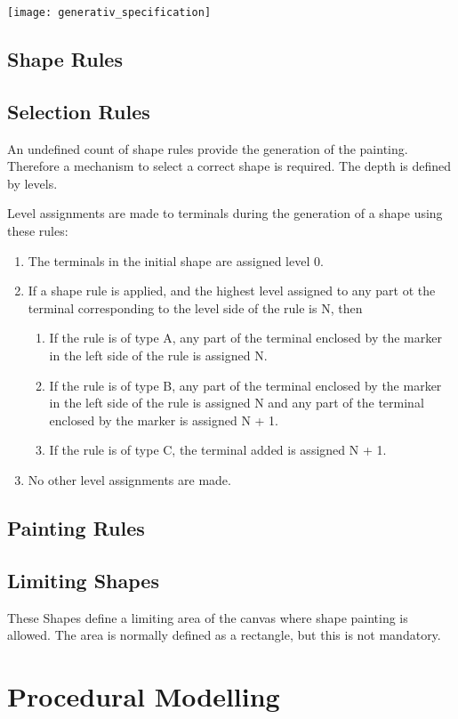 \documentclass[11pt, a4paper]{report}
\begin{document}
\texttt{[image: generativ\_specification]}
\subsection{Shape Rules}


\subsection{Selection Rules}
An undefined count of shape rules provide the generation of the painting. Therefore a mechanism to select a correct shape is required. The depth is defined by levels.
\begin{displayquote}
	Level assignments are made to terminals during the generation of a shape using these rules:
	\begin{enumerate}
		\item The terminals in the initial shape are assigned level 0.
		\item If a shape rule is applied, and the highest level assigned to any part ot the terminal corresponding to the level side of the rule is N, then
		\begin{enumerate}
			\item If the rule is of type A, any part of the terminal enclosed by the marker in the left side of the rule is assigned N.
			\item If the rule is of type B, any part of the terminal enclosed by the marker in the left side of the rule is assigned N and any part of the terminal enclosed by the marker is assigned N + 1.
			\item If the rule is of type C, the terminal added is assigned N + 1.
		\end{enumerate}
		\item No other level assignments are made.
	\end{enumerate}
\end{displayquote}
\subsection{Painting Rules}

\subsection{Limiting Shapes}
These Shapes define a limiting area of the canvas where shape painting is allowed. The area is normally defined as a rectangle, but this is not mandatory. 

\section{Procedural Modelling} 
\end{document}
